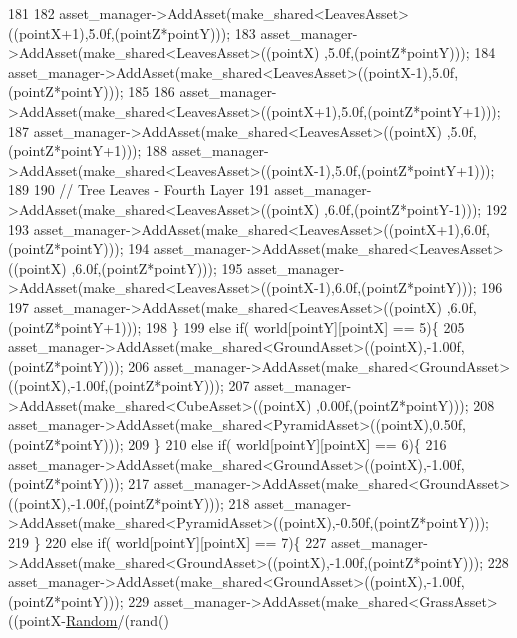 \begin{DoxyCode}
181 
182             asset\_manager->AddAsset(make\_shared<LeavesAsset>((pointX+1),5.0f,(pointZ*pointY)));
183             asset\_manager->AddAsset(make\_shared<LeavesAsset>((pointX)  ,5.0f,(pointZ*pointY)));
184             asset\_manager->AddAsset(make\_shared<LeavesAsset>((pointX-1),5.0f,(pointZ*pointY)));
185  
186             asset\_manager->AddAsset(make\_shared<LeavesAsset>((pointX+1),5.0f,(pointZ*pointY+1)));
187             asset\_manager->AddAsset(make\_shared<LeavesAsset>((pointX)  ,5.0f,(pointZ*pointY+1)));
188             asset\_manager->AddAsset(make\_shared<LeavesAsset>((pointX-1),5.0f,(pointZ*pointY+1)));
189 
190             \textcolor{comment}{// Tree Leaves - Fourth Layer}
191             asset\_manager->AddAsset(make\_shared<LeavesAsset>((pointX)  ,6.0f,(pointZ*pointY-1)));
192 
193             asset\_manager->AddAsset(make\_shared<LeavesAsset>((pointX+1),6.0f,(pointZ*pointY)));
194             asset\_manager->AddAsset(make\_shared<LeavesAsset>((pointX)  ,6.0f,(pointZ*pointY)));
195             asset\_manager->AddAsset(make\_shared<LeavesAsset>((pointX-1),6.0f,(pointZ*pointY)));
196 
197             asset\_manager->AddAsset(make\_shared<LeavesAsset>((pointX)  ,6.0f,(pointZ*pointY+1)));
198    \}
199     \textcolor{keywordflow}{else} \textcolor{keywordflow}{if}( world[pointY][pointX] == 5)\{
205             asset\_manager->AddAsset(make\_shared<GroundAsset>((pointX),-1.00f,(pointZ*pointY)));
206             asset\_manager->AddAsset(make\_shared<GroundAsset>((pointX),-1.00f,(pointZ*pointY)));
207             asset\_manager->AddAsset(make\_shared<CubeAsset>((pointX)  ,0.00f,(pointZ*pointY)));
208             asset\_manager->AddAsset(make\_shared<PyramidAsset>((pointX),0.50f,(pointZ*pointY)));
209    \}
210     \textcolor{keywordflow}{else} \textcolor{keywordflow}{if}( world[pointY][pointX] == 6)\{
216             asset\_manager->AddAsset(make\_shared<GroundAsset>((pointX),-1.00f,(pointZ*pointY)));
217             asset\_manager->AddAsset(make\_shared<GroundAsset>((pointX),-1.00f,(pointZ*pointY)));
218             asset\_manager->AddAsset(make\_shared<PyramidAsset>((pointX),-0.50f,(pointZ*pointY)));
219    \}
220     \textcolor{keywordflow}{else} \textcolor{keywordflow}{if}( world[pointY][pointX] == 7)\{
227             asset\_manager->AddAsset(make\_shared<GroundAsset>((pointX),-1.00f,(pointZ*pointY)));
228             asset\_manager->AddAsset(make\_shared<GroundAsset>((pointX),-1.00f,(pointZ*pointY)));
229             asset\_manager->AddAsset(make\_shared<GrassAsset>((pointX-\hyperlink{classGameWorld_a56652cc9880b3ba1be61395066c863c3}{Random}/(rand() %

\end{DoxyCode}
